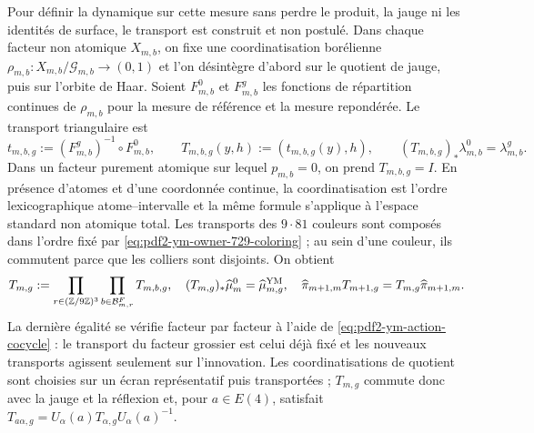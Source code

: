 Pour définir la dynamique sur cette mesure sans perdre le produit, la jauge ni les identités de surface, le transport est construit et non postulé. Dans chaque facteur non atomique $X_{m,b}$, on fixe une coordinatisation borélienne $\rho_{m,b}:X_{m,b}/\mathcal G_{m,b}\to(0,1)$ et l'on désintègre d'abord sur le quotient de jauge, puis sur l'orbite de Haar. Soient $F_{m,b}^0$ et $F_{m,b}^g$ les fonctions de répartition continues de $\rho_{m,b}$ pour la mesure de référence et la mesure repondérée. Le transport triangulaire est
\begin{equation}\label{eq:pdf2-ym-gibbs-transport-factor}
 t_{m,b,g}:=(F_{m,b}^g)^{-1}\circ F_{m,b}^0,
 \qquad
 T_{m,b,g}(y,h):=(t_{m,b,g}(y),h),
 \qquad
 (T_{m,b,g})_*\lambda_{m,b}^0=\lambda_{m,b}^g.
\end{equation}
Dans un facteur purement atomique sur lequel $p_{m,b}=0$, on prend $T_{m,b,g}=I$. En présence d'atomes et d'une coordonnée continue, la coordinatisation est l'ordre lexicographique atome--intervalle et la même formule s'applique à l'espace standard non atomique total. Les transports des $9\cdot81$ couleurs sont composés dans l'ordre fixé par \eqref{eq:pdf2-ym-owner-729-coloring} ; au sein d'une couleur, ils commutent parce que les colliers sont disjoints. On obtient
\begin{equation}\label{eq:pdf2-ym-gibbs-transport-global}
 T_{m,g}:=\prod_{r\in(\mathbb Z/9\mathbb Z)^3}
           \prod_{b\in\mathcal B_{m,r}^{F}}T_{m,b,g},
 \quad
 (T_{m,g})_*\widehat\mu_m^0=\widehat\mu_{m,g}^{\rm YM},
 \quad
 \widehat\pi_{m+1,m}T_{m+1,g}=T_{m,g}\widehat\pi_{m+1,m}.
\end{equation}
La dernière égalité se vérifie facteur par facteur à l'aide de \eqref{eq:pdf2-ym-action-cocycle} : le transport du facteur grossier est celui déjà fixé et les nouveaux transports agissent seulement sur l'innovation. Les coordinatisations de quotient sont choisies sur un écran représentatif puis transportées ; $T_{m,g}$ commute donc avec la jauge et la réflexion et, pour $a\in E(4)$, satisfait $T_{a\alpha,g}=U_\alpha(a)T_{\alpha,g}U_\alpha(a)^{-1}$.

